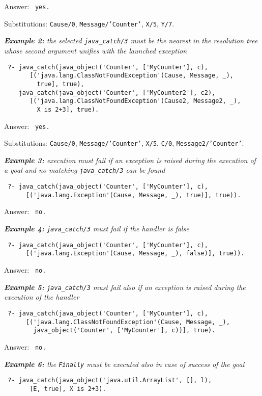 Answer: \texttt{ yes.}

Substitutions: \texttt{Cause/0}, \texttt{Message/'Counter'}, \texttt{X/5}, \texttt{Y/7}.

\medskip
\textit{\textbf{Example 2:} the selected \texttt{java\_catch/3} must be the nearest in the
resolution tree whose second argument unifies with the launched exception}
\begin{verbatim}
 ?- java_catch(java_object('Counter', ['MyCounter'], c),
       [('java.lang.ClassNotFoundException'(Cause, Message, _),
         true], true),
    java_catch(java_object('Counter', ['MyCounter2'], c2),
       [('java.lang.ClassNotFoundException'(Cause2, Message2, _),
         X is 2+3], true).
\end{verbatim}

Answer: \texttt{ yes.}

Substitutions: \texttt{Cause/0}, \texttt{Message/'Counter'}, \texttt{X/5}, \texttt{C/0},
\texttt{Message2/'Counter'}.

\medskip
\textit{\textbf{Example 3:} execution must fail if an exception is raised during the execution of
a goal and no matching \texttt{java\_catch/3} can be found}
\begin{verbatim}
 ?- java_catch(java_object('Counter', ['MyCounter'], c),
      [('java.lang.Exception'(Cause, Message, _), true)], true)).
\end{verbatim}

Answer: \texttt{ no.}

\medskip
\textit{\textbf{Example 4:} \texttt{java\_catch/3} must fail if the handler is false}
\begin{verbatim}
 ?- java_catch(java_object('Counter', ['MyCounter'], c),
      [('java.lang.Exception'(Cause, Message, _), false)], true)).
\end{verbatim}

Answer: \texttt{ no.}

\medskip
\textit{\textbf{Example 5:} \texttt{java\_catch/3} must fail also if an exception is raised during
the execution of the handler}
\begin{verbatim}
 ?- java_catch(java_object('Counter', ['MyCounter'], c),
      [('java.lang.ClassNotFoundException'(Cause, Message, _),
        java_object('Counter', ['MyCounter'], c))], true).
\end{verbatim}

Answer: \texttt{ no.}

\medskip
\textit{\textbf{Example 6:} the \textit{\texttt{Finally}} must be executed also in case of success
of the goal}
\begin{verbatim}
 ?- java_catch(java_object('java.util.ArrayList', [], l),
       [E, true], X is 2+3).
\end{verbatim}

